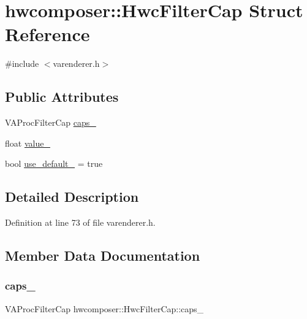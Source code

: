 \hypertarget{structhwcomposer_1_1HwcFilterCap}{}\section{hwcomposer\+:\+:Hwc\+Filter\+Cap Struct Reference}
\label{structhwcomposer_1_1HwcFilterCap}


{\ttfamily \#include $<$varenderer.\+h$>$}

\subsection*{Public Attributes}
\begin{DoxyCompactItemize}
\item 
V\+A\+Proc\+Filter\+Cap \mbox{\hyperlink{structhwcomposer_1_1HwcFilterCap_a142f15f008008849faa7f8102e7ed7c3}{caps\+\_\+}}
\item 
float \mbox{\hyperlink{structhwcomposer_1_1HwcFilterCap_add5d14e96796b2c0230f11a99fa1254f}{value\+\_\+}}
\item 
bool \mbox{\hyperlink{structhwcomposer_1_1HwcFilterCap_ab934d5bbd9e4f61bdafccd6d620f3e09}{use\+\_\+default\+\_\+}} = true
\end{DoxyCompactItemize}


\subsection{Detailed Description}


Definition at line 73 of file varenderer.\+h.



\subsection{Member Data Documentation}
\mbox{\label{structhwcomposer_1_1HwcFilterCap_a142f15f008008849faa7f8102e7ed7c3}} 
\subsubsection{\texorpdfstring{caps\+\_\+}{caps\_}}
{\footnotesize\ttfamily V\+A\+Proc\+Filter\+Cap hwcomposer\+::\+Hwc\+Filter\+Cap\+::caps\+\_\+}




